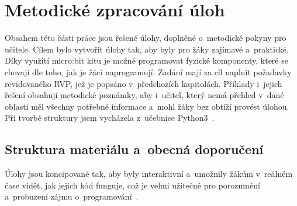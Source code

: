 \documentclass[
  digital,     %
  oneside,     %
  nosansbold,  %
  colorbold, %
  lof,         %
  nolot,         %
]{fithesis4}
\begin{document}
\chapter{Metodické zpracování úloh}
Obsahem této části práce jsou řešené úlohy, doplněné o~metodické pokyny pro učitele. Cílem bylo vytvořit úlohy tak, aby byly pro žáky zajímavé a~praktické. Díky využití micro:bit kitu je možné programovat fyzické komponenty, které se chovají dle toho, jak je žáci naprogramují. Zadání mají za cíl naplnit požadavky revidovaného RVP, jež je popsáno v~předchozích kapitolách. Příklady i~jejich řešení obsahují metodické poznámky, aby i~učitel, který nemá přehled v~dané oblasti měl všechny potřebné informace a~mohl žáky bez obtíží provést úlohou. Při tvorbě struktury jsem vycházela z~učebnice Python3~\cite{Summerfield10}.

\section{Struktura materiálu a~obecná doporučení}
Úlohy jsou koncipované tak, aby byly interaktivní a~umožnily žákům v~reálném čase vidět, jak jejich kód funguje, což je velmi užitečné pro porozumění a~probuzení zájmu o~programování~\cite{Fagerlund22}. 
\end{document}
